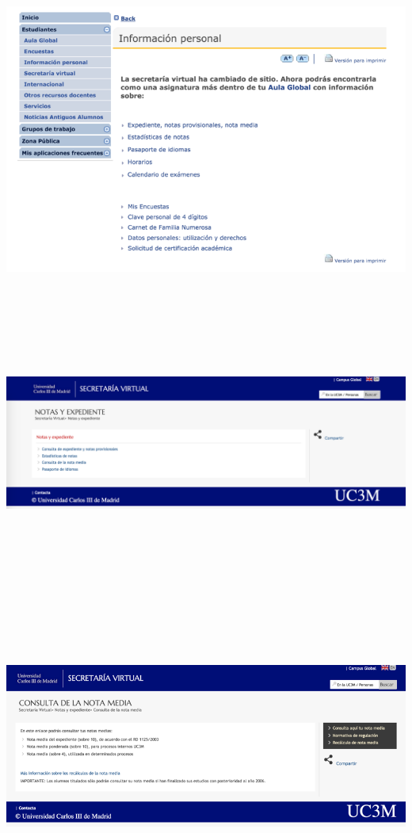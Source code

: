 \documentclass{article}
\begin{document}
\includegraphics[width=15cm, height=10cm, keepaspectratio]{personalinformation} \vspace{0.3cm} \\
\includegraphics[width=15cm, height=10cm, keepaspectratio]{notasyexpediente} \vspace{0.3cm} \\
\includegraphics[width=15cm, height=10cm, keepaspectratio]{consulta}\vspace{0.3cm} \\
\end{document}
